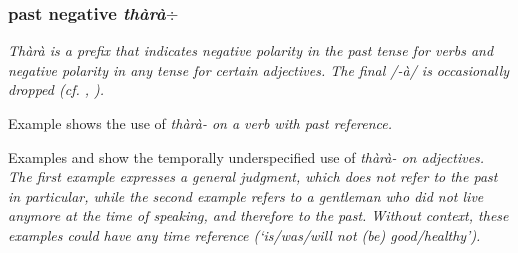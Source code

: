 % 




\subsubsection{past negative \em thàrà$\div$\em}\label{sec:morph:thara-}
\em Thàrà \em is a prefix that indicates negative polarity in the past tense for verbs and negative polarity in any tense for certain adjectives. The final /-à/ is occasionally dropped (cf. \citet[26]{Adelaar1991}, \citet[141]{Slomanson2006cll}).

Example  shows the use of \em thàrà- \em on a verb with past reference.


Examples  and   show the temporally underspecified use of \em thàrà- \em on adjectives. The first example expresses a general judgment, which does not refer to the past in particular, while the second example refers to a gentleman who did not live anymore at the time of speaking, and therefore to the past. Without context, these examples could have any time reference (`is/was/will not (be) good/healthy').







